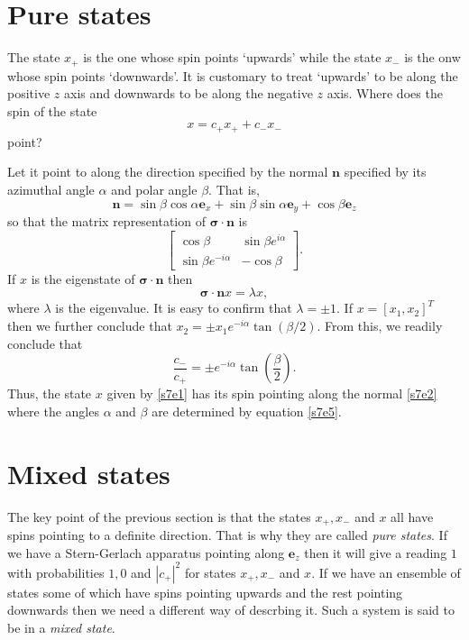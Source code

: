 \documentclass{article}
\numberwithin{equation}{section}
\let\vec\bm
\theoremstyle{plain}
\numberwithin{thm}{section}
\theoremstyle{plain}
\numberwithin{prop}{section}
\theoremstyle{definition}
\numberwithin{defn}{section}
\theoremstyle{remark}
\begin{document}
\section{Pure states}\label{s7}
The state $x_+$ is the one whose spin points `upwards' while the state $x_-$
is the onw whose spin points `downwards'. It is customary to treat `upwards'
to be along the positive $z$ axis and downwards to be along the negative
$z$ axis. Where does the spin of the state
\begin{equation}\label{s7e1}
x = c_+x_+ + c_-x_-
\end{equation}
point?

Let it point to along the direction specified by the normal $\vec{n}$ specified
by its azimuthal angle $\alpha$ and polar angle $\beta$. That is,
\begin{equation}\label{s7e2}
\vec{n} = \sin\beta\cos\alpha\vec{e}_x + \sin\beta\sin\alpha\vec{e}_y +
\cos\beta\vec{e}_z
\end{equation}
so that the matrix representation of $\vec{\sigma}\cdot\vec{n}$ is
\begin{equation}\label{s7e3}
\begin{bmatrix}
\cos\beta & \sin\beta e^{i\alpha} \\
\sin\beta e^{-i\alpha} & -\cos\beta
\end{bmatrix}.
\end{equation}
If $x$ is the eigenstate of $\vec{\sigma}\cdot\vec{n}$ then
\begin{equation}\label{s7e4}
\vec{\sigma}\cdot\vec{n}x = \lambda x,
\end{equation}
where $\lambda$ is the eigenvalue. It is easy to confirm that $\lambda = \pm 1$.
If $x = [x_1, x_2]^T$ then we further conclude that $x_2 = \pm x_1 e^{-i\alpha}
\tan(\beta/2)$. From this, we readily conclude that
\begin{equation}\label{s7e5}
\frac{c_-}{c_+} = \pm e^{-i\alpha}\tan\left(\frac{\beta}{2}\right).
\end{equation}
Thus, the state $x$ given by \eqref{s7e1} has its spin pointing along the
normal \eqref{s7e2} where the angles $\alpha$ and $\beta$ are determined by
equation \eqref{s7e5}.

\section{Mixed states}\label{s8}
The key point of the previous section is that the states $x_+, x_-$ and $x$ all 
have spins pointing to a definite direction. That is why they are called \emph{
pure states}. If we have a Stern-Gerlach apparatus pointing along $\vec{e}_z$ 
then it will give a reading $1$ with probabilities $1, 0$ and $|c_+|^2$ for 
states $x_+ , x_-$ and $x$. If we have an ensemble of states some of which have 
spins pointing upwards and the rest pointing downwards then we need a different 
way of descrbing it. Such a system is said to be in a \emph{mixed state}.
\end{document}
